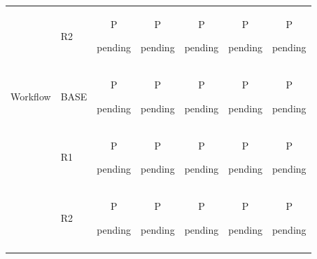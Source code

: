 \begin{tabular}{@{}llccccc@{}}
 & R2 & \shortstack[c]{\strut P\\[-3pt]\strut pending} & \shortstack[c]{\strut P\\[-3pt]\strut pending} & \shortstack[c]{\strut P\\[-3pt]\strut pending} & \shortstack[c]{\strut P\\[-3pt]\strut pending} & \shortstack[c]{\strut P\\[-3pt]\strut pending}\\
\addlinespace[2pt]
Workflow & BASE & \shortstack[c]{\strut P\\[-3pt]\strut pending} & \shortstack[c]{\strut P\\[-3pt]\strut pending} & \shortstack[c]{\strut P\\[-3pt]\strut pending} & \shortstack[c]{\strut P\\[-3pt]\strut pending} & \shortstack[c]{\strut P\\[-3pt]\strut pending}\\
 & R1 & \shortstack[c]{\strut P\\[-3pt]\strut pending} & \shortstack[c]{\strut P\\[-3pt]\strut pending} & \shortstack[c]{\strut P\\[-3pt]\strut pending} & \shortstack[c]{\strut P\\[-3pt]\strut pending} & \shortstack[c]{\strut P\\[-3pt]\strut pending}\\
 & R2 & \shortstack[c]{\strut P\\[-3pt]\strut pending} & \shortstack[c]{\strut P\\[-3pt]\strut pending} & \shortstack[c]{\strut P\\[-3pt]\strut pending} & \shortstack[c]{\strut P\\[-3pt]\strut pending} & \shortstack[c]{\strut P\\[-3pt]\strut pending}\\
\addlinespace[2pt]
\bottomrule
\end{tabular}\endgroup
